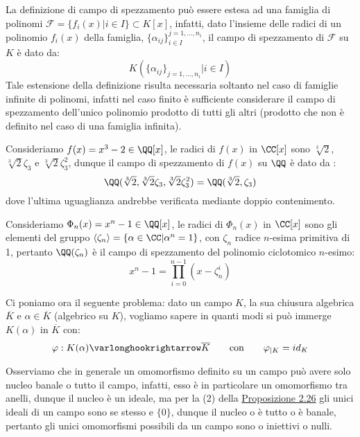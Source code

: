 \documentclass[11pt]{scrartcl}
\begin{document}
\begin{remark}
    La definizione di campo di spezzamento può essere estesa ad una famiglia di polinomi $\mathcal{F} = \{f_i(x) | i \in I\} \subset K[x]$, infatti, dato l'insieme delle radici di un polinomio $f_i(x)$ della famiglia,
    $ \{\alpha_{ij}\}_{i \in I}^{j = 1,\ldots,n_i} $, il campo di spezzamento di $\mathcal{F}$ su $K$ è dato da:
    \[ K(\{\alpha_{ij}\}_{j = 1,\ldots,n_i} | i \in I)
        \]
    Tale estensione della definizione risulta necessaria soltanto nel caso di famiglie infinite di polinomi, infatti nel caso finito è sufficiente considerare il campo di spezzamento dell'unico polinomio prodotto di tutti gli altri 
    (prodotto che non è definito nel caso di una famiglia infinita).
\end{remark}

\begin{example}
    Consideriamo $f(x) = x^3 - 2 \in \QQ[x]$, le radici di $f(x)$ in $\CC[x]$ sono $\sqrt[3]{2}$,$\sqrt[3]{2}\zeta_3$ e $\sqrt[3]{2}\zeta_3^2$, dunque il campo di spezzamento di $f(x)$ su $\QQ$ è dato da :
    \[ \QQ(\sqrt[3]{2},\sqrt[3]{2}\zeta_3,\sqrt[3]{2}\zeta_3^2) = \QQ(\sqrt[3]{2},\zeta_3)
        \]
    dove l'ultima uguaglianza andrebbe verificata mediante doppio contenimento.
\end{example}

\begin{example}
    Consideriamo $\Phi_n(x) = x^n - 1 \in \QQ[x]$, le radici di $\Phi_n(x)$ in $\CC[x]$ sono gli elementi del gruppo $\left<\zeta_n\right> = \{\alpha \in \CC | \alpha^n = 1\}$, con $\zeta_n$ radice $n$-esima primitiva di 1,
    pertanto $\QQ(\zeta_n)$ è il campo di spezzamento del polinomio ciclotomico $n$-esimo:
    \[ x^n - 1 = \prod_{i = 0}^{n-1} (x - \zeta_n^i)
        \]
\end{example}

Ci poniamo ora il seguente problema: dato un campo $K$, la sua chiusura algebrica $\overline K$ e $\alpha \in \overline K$ (algebrico su $K$), vogliamo sapere in quanti modi si può immerge $K(\alpha)$ in $\overline K$ con:
\[ \varphi : K(\alpha) \varlonghookrightarrow \overline K \qquad \text{con} \qquad \varphi_{|K} = id_K
    \]

\begin{remark}
    \label{3.32}
Osserviamo che in generale un omomorfismo definito su un campo può avere solo nucleo banale o tutto il campo, infatti, esso è in particolare un omomorfismo tra anelli, dunque il nucleo è un ideale, ma per la (2) della \hyperref[2.26]{Proposizione 2.26} gli unici ideali di un campo 
sono se stesso e $\{0\}$, dunque il nucleo o è tutto o è banale, pertanto gli unici omomorfismi possibili da un campo sono o iniettivi o nulli.    
\end{remark}
\end{document}
